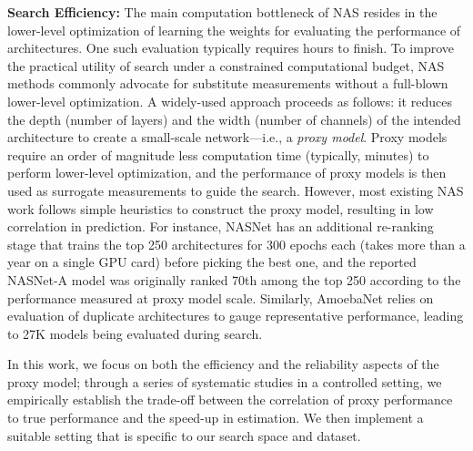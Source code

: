 \documentclass[journal]{IEEEtran}
\theoremstyle{definition}
\theoremstyle{remark}
\begin{document}
\vspace{3pt}
{
\noindent\textbf{Search Efficiency:} The main computation bottleneck of NAS resides in the lower-level optimization of learning the weights for evaluating the performance of architectures. One such evaluation typically requires hours to finish. To improve the practical utility of search under a constrained computational budget, NAS methods commonly advocate for substitute measurements without a full-blown lower-level optimization. A widely-used approach proceeds as follows: it reduces the depth (number of layers) and the width (number of channels) of the intended architecture to create a small-scale network---i.e., a \emph{proxy model}. Proxy models require an order of magnitude less computation time (typically, minutes) to perform lower-level optimization, and the performance of proxy models is then used as surrogate measurements to guide the search. However, most existing NAS work \cite{nasnet2018,liu2018hierarchical,zhong2017blockqnn,real2019regularized,liu2018progressive} follows simple heuristics to construct the proxy model, resulting in low correlation in prediction. For instance, NASNet \cite{nasnet2018} has an additional re-ranking stage that trains the top 250 architectures for 300 epochs each (takes more than a year on a single GPU card) before picking the best one, and the reported NASNet-A model was originally ranked 70th among the top 250 according to the performance measured at proxy model scale. Similarly, AmoebaNet \cite{real2019regularized} relies on evaluation of duplicate architectures to gauge representative performance, leading to 27K models being evaluated during search.

In this work, we focus on both the efficiency and the reliability aspects of the proxy model; through a series of systematic studies in a controlled setting, we empirically establish the trade-off between the correlation of proxy performance to true performance and the speed-up in estimation. We then implement a suitable setting that is specific to our search space and dataset.}
\end{document}
